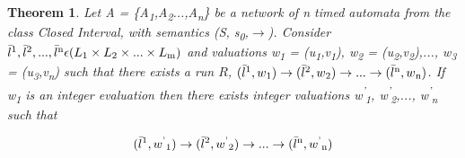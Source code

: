 \documentclass[12pt,letterpaper]{report}
\newtheorem{theorem}{Theorem}
\begin{document}
\begin{theorem}
Let {\it A} = \{{\it A}\textsubscript{1},{\it A}\textsubscript{2}...,{\it A}\textsubscript{n}\} be a network of n timed automata from the class Closed Interval, with semantics (S, s\textsubscript{0},$\rightarrow$). Consider $\bar{l} \textsuperscript{1},\bar{l} \textsuperscript{2},...,\bar{l} \textsuperscript{n}  \epsilon  (L\textsubscript{1} \times L\textsubscript{2} \times...\times L\textsubscript{m})$ and valuations w\textsubscript{1} = (u\textsubscript{1},v\textsubscript{1}), w\textsubscript{2} = (u\textsubscript{2},v\textsubscript{2}),..., w\textsubscript{3} = (u\textsubscript{3},v\textsubscript{n}) such that there exists a run $R$, $(\bar{l} \textsuperscript{1},w\textsubscript{1}) \rightarrow (\bar{l} \textsuperscript{2},w\textsubscript{2}) \rightarrow ... \rightarrow (\bar{l} \textsuperscript{n},w\textsubscript{n})$. If w\textsubscript{1} is an integer evaluation then there exists integer valuations  w\textsuperscript{'}\textsubscript{1}, w\textsuperscript{'}\textsubscript{2},..., w\textsuperscript{'}\textsubscript{n} such that

\begin{equation}
(\bar{l} \textsuperscript{1},w\textsuperscript{'}\textsubscript{1}) \rightarrow (\bar{l} \textsuperscript{2},w\textsuperscript{'}\textsubscript{2}) \rightarrow ... \rightarrow (\bar{l} \textsuperscript{n},w\textsuperscript{'}\textsubscript{n})
\end{equation}

\end{theorem}
\end{document}
